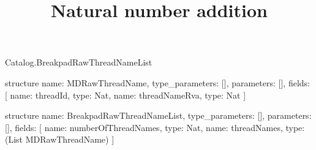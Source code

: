 \begin{lexlean}{Catalog.BreakpadRawThreadNameList}
\title{Natural number addition}
\begin{semanticmodule}
structure{
  name: MDRawThreadName,
  type_parameters: [],
  parameters: [],
  fields: [
    {name: threadId, type: Nat},
    {name: threadNameRva, type: Nat}
  ]
}

structure{
  name: BreakpadRawThreadNameList,
  type_parameters: [],
  parameters: [],
  fields: [
    {name: numberOfThreadNames, type: Nat},
    {name: threadNames, type: (List MDRawThreadName)}
  ]
}
\end{semanticmodule}
\end{lexlean}

